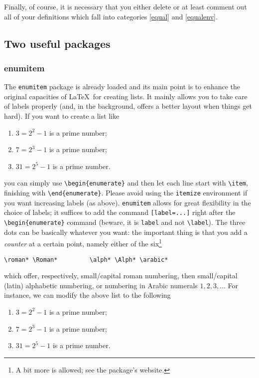\documentclass[Unicode]{cedram-alco}
\begin{document}
    Finally, of course, it is necessary that you either delete or at
    least comment out all of your definitions which fall into categories
    \ref{equal} and \ref{equalenv}.

\subsection{Two useful packages}

\subsubsection{enumitem}\label{subsubsec:enumitem}
The \verb|enumitem| package is already loaded and its main point is to
enhance the original capacities of \LaTeX\ for creating lists. It
mainly allows you to take care of labels properly (and, in the
background, offers a better layout when things get hard). If you want
to create a list like
\begin{enumerate}
\item $3=2^2-1$ is a prime number;
\item $7=2^3-1$ is a prime number;
\item $31=2^5-1$ is a prime number.
\end{enumerate}
you can simply use \verb|\begin{enumerate}| and then let each line
  start with \verb|\item|, finishing with
  \verb|\end{enumerate}|. Please avoid using the \verb|itemize|
environment if you want increasing labels (as above). \verb|enumitem|
allows for great flexibility in the choice of labels; it suffices to
add the command \verb|[label=...]| right after the
\verb|\begin{enumerate}| command (beware, it is \verb|label| and not
  \verb|\label|). The three dots can be basically whatever you want:
  the important thing is that you add a \emph{counter} at a certain
  point, namely either of the six\footnote{A bit more is allowed; see
    the package's website.}
\begin{verbatim}
\roman*	\Roman*			\alph* \Alph* \arabic*		
\end{verbatim}
which offer, respectively, small/capital roman numbering, then small/capital (latin) alphabetic numbering, or numbering in Arabic numerals $1,2,3,\dots$ For instance, we can modify the above list to the following
\begin{enumerate}[label=Mers \textbf{Prim} \arabic*)]
\item $3=2^2-1$ is a prime number;
\item $7=2^3-1$ is a prime number;
\item $31=2^5-1$ is a prime number.
\end{enumerate}
\end{document}
